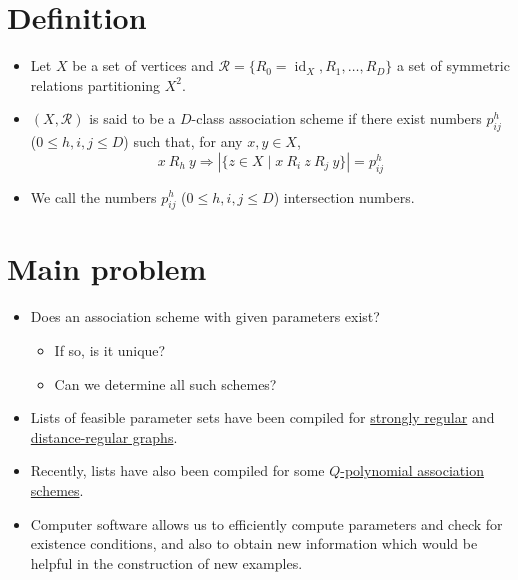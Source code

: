 \documentclass[11pt]{article}
\providecommand{\tightlist}{%
      \setlength{\itemsep}{0pt}\setlength{\parskip}{0pt}}
\renewcommand{\textbf}[1]{\textcolor[rgb]{1,0,0}{{#1}}}
\renewcommand{\emph}[1]{\textcolor[rgb]{0,0,1}{{#1}}}
\renewcommand{\sout}[1]{\textcolor[rgb]{0,0.5,0}{{#1}}}
\begin{document}
    \hypertarget{definition}{%
\section*{Definition}\label{definition}}

\begin{itemize}
\item
  Let \textbf{\(X\)} be a set of \emph{vertices} and
  \textbf{\(\mathcal{R} = \{R_0 = \operatorname{id}_X, R_1, \dots, R_D\}\)}
  a set of \emph{symmetric relations} partitioning \emph{\(X^2\)}.
\item
  \textbf{\((X, \mathcal{R})\)} is said to be a \textbf{\(D\)-class
  association scheme} if there exist numbers \textbf{\(p^h_{ij}\)}
  (\(0 \le h, i, j \le D\)) such that, for any \emph{\(x, y \in X\)},
  \textbf{\[
  x \ R_h \ y \Rightarrow |\{z \in X \mid x \ R_i \ z \ R_j \ y\}| = p^h_{ij}
  \]}
\item
  We call the numbers \textbf{\(p^h_{ij}\)} (\(0 \le h, i, j \le D\))
  \textbf{intersection numbers}.
\end{itemize}

\newpage

    \hypertarget{main-problem}{%
\section*{Main problem}\label{main-problem}}

\begin{itemize}
\tightlist
\item
  Does an association scheme with given parameters \sout{exist}?

  \begin{itemize}
  \tightlist
  \item
    If so, is it \sout{unique}?
  \item
    Can we determine \sout{all} such schemes?
  \end{itemize}
\item
  \sout{Lists} of feasible parameter sets have been compiled for
  \href{https://www.win.tue.nl/~aeb/graphs/srg/srgtab.html}{\textbf{strongly
  regular}} and
  \href{https://www.win.tue.nl/~aeb/drg/drgtables.html}{\textbf{distance-regular
  graphs}}.
\item
  Recently, lists have also been compiled for some
  \href{http://www.uwyo.edu/jwilliford/}{\textbf{\(Q\)-polynomial
  association schemes}}.
\item
  Computer software allows us to \emph{efficiently} compute parameters
  and check for \emph{existence conditions}, and also to obtain new
  information which would be helpful in the \sout{construction} of new
  examples.
\end{itemize}
\end{document}
